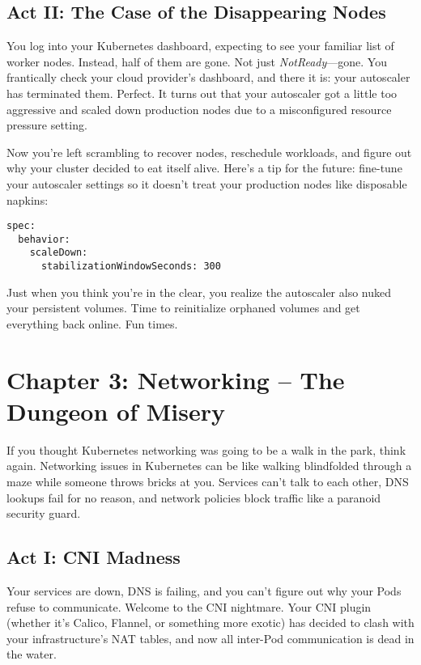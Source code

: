 
\subsection{Act II: The Case of the Disappearing Nodes}

You log into your Kubernetes dashboard, expecting to see your familiar list of worker nodes. Instead, half of them are gone. Not just \textit{NotReady}—gone. You frantically check your cloud provider’s dashboard, and there it is: your autoscaler has terminated them. Perfect. It turns out that your autoscaler got a little too aggressive and scaled down production nodes due to a misconfigured resource pressure setting.

Now you’re left scrambling to recover nodes, reschedule workloads, and figure out why your cluster decided to eat itself alive. Here’s a tip for the future: fine-tune your autoscaler settings so it doesn’t treat your production nodes like disposable napkins:

\begin{lstlisting}
spec:
  behavior:
    scaleDown:
      stabilizationWindowSeconds: 300
\end{lstlisting}

Just when you think you’re in the clear, you realize the autoscaler also nuked your persistent volumes. Time to reinitialize orphaned volumes and get everything back online. Fun times.

\section{Chapter 3: Networking – The Dungeon of Misery}

If you thought Kubernetes networking was going to be a walk in the park, think again. Networking issues in Kubernetes can be like walking blindfolded through a maze while someone throws bricks at you. Services can’t talk to each other, DNS lookups fail for no reason, and network policies block traffic like a paranoid security guard.

\subsection{Act I: CNI Madness}

Your services are down, DNS is failing, and you can’t figure out why your Pods refuse to communicate. Welcome to the CNI nightmare. Your CNI plugin (whether it's Calico, Flannel, or something more exotic) has decided to clash with your infrastructure’s NAT tables, and now all inter-Pod communication is dead in the water.

